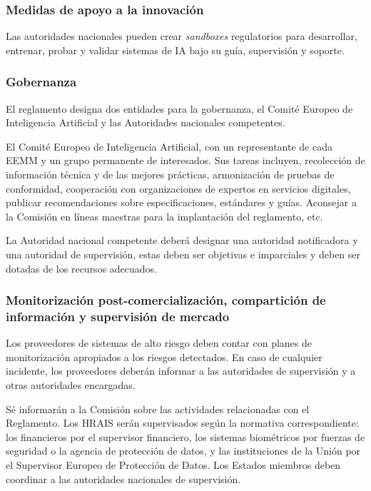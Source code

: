 \subsubsection{Medidas de apoyo a la innovación}

Las autoridades nacionales pueden crear \textit{sandboxes} regulatorios para desarrollar, entrenar, probar y validar sistemas de \acrfull{IA} bajo su guía, supervisión y soporte.

\subsubsection{Gobernanza}

El reglamento designa dos entidades para la gobernanza, el Comité Europeo de Inteligencia Artificial y las Autoridades nacionales competentes.

El Comité Europeo de Inteligencia Artificial, con un representante de cada \acrshort{EEMM} y un grupo permanente de interesados. Sus tareas incluyen, recolección de información técnica y de las mejores prácticas, armonización de pruebas de conformidad, cooperación con organizaciones de expertos en servicios digitales, publicar recomendaciones sobre especificaciones, estándares y guías. Aconsejar a la Comisión en líneas maestras para la implantación del reglamento, etc.

La Autoridad nacional competente deberá designar una autoridad notificadora y una autoridad de supervisión, estas deben ser objetivas e imparciales y deben ser dotadas de los recursos adecuados.

\subsubsection{Monitorización post-comercialización, compartición de información y supervisión de mercado}

Los proveedores de sistemas de alto riesgo deben contar con planes de monitorización apropiados a los riesgos detectados. En caso de cualquier incidente, los proveedores deberán informar a las autoridades de supervisión y a otras autoridades encargadas.

Sé informarán a la Comisión sobre las actividades relacionadas con el Reglamento. Los \acrshort{HRAIS} serán supervisados según la normativa correspondiente: los financieros por el supervisor financiero, los sistemas biométricos por fuerzas de seguridad o la agencia de protección de datos, y las instituciones de la Unión por el Supervisor Europeo de Protección de Datos. Los Estados miembros deben coordinar a las autoridades nacionales de supervisión.

